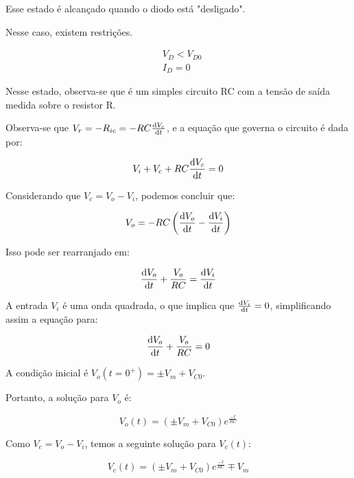 Esse estado é alcançado quando o diodo está "desligado".

Nesse caso, existem restrições.

\begin{equation}
    \begin{aligned}
         & V_D < V_{D0} \\
         & I_D = 0
    \end{aligned}
\end{equation}

Nesse estado, observa-se que é um simples circuito RC com a tensão de saída medida sobre o resistor R.

Observa-se que $V_r = - R_{ic} = - R C \frac{\mathrm d V_c}{\mathrm d t}$, e a equação que governa o circuito é dada por:

\begin{equation}
    V_i + V_c + R C \frac{\mathrm d V_c}{\mathrm d t} = 0
\end{equation}

Considerando que $V_c = V_o - V_i$, podemos concluir que:

\begin{equation}
    V_o = - R C \left( \frac{\mathrm d V_o}{\mathrm d t} - \frac{\mathrm d V_i}{\mathrm d t} \right)
\end{equation}

Isso pode ser rearranjado em:

\begin{equation}
    \frac{\mathrm d V_o}{\mathrm d t} + \frac{V_o}{R C} = \frac{\mathrm d V_i}{\mathrm d t}
\end{equation}

A entrada $V_i$ é uma onda quadrada, o que implica que $\frac{\mathrm d V_i}{\mathrm d t} = 0$, simplificando assim a equação para:

\begin{equation}
    \frac{\mathrm d V_o}{\mathrm d t} + \frac{V_o}{R C} = 0
\end{equation}

A condição inicial é $V_o(t=0^{+}) = \pm V_m + V_{C0}$.

Portanto, a solução para $V_o$ é:

\begin{equation}
    V_o(t) = (\pm V_m + V_{C0}) e^{\frac{-t}{R C}}
\end{equation}

Como $V_c = V_o - V_i$, temos a seguinte solução para $V_c(t)$:

\begin{equation}
    \label{eq:vc_estado2}
    V_c(t) = (\pm V_m + V_{C0}) e^{\frac{-t}{R C}} \mp V_m
\end{equation}

